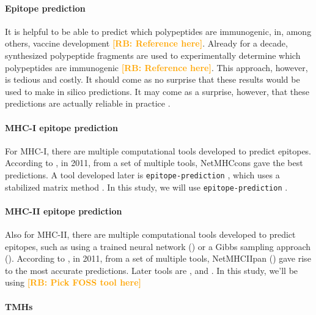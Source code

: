 \documentclass{article}
\newcommand{\richel}[1]{\textcolor{orange}{\textbf{[RB: #1]}}}
\begin{document}
\paragraph{Epitope prediction}

It is helpful to be able to predict which polypeptides are immunogenic,
in, among others, vaccine development \richel{Reference here}. 
Already for a decade, synthesized polypeptide fragments are used 
to experimentally determine which polypeptides
are immunogenic \richel{Reference here}.
This approach, however, is tedious and costly.
It should come as no surprise that these results would be used
to make in silico predictions.
It may come as a surprise, however, that these predictions
are actually reliable in practice \cite{larsen2010identification,schellens2008unanticipated,tang2011genome}.

\paragraph{MHC-I epitope prediction}

For MHC-I, there are multiple computational tools developed 
to predict epitopes. 
According to \cite{lundegaard2011prediction}, in 2011,
from a set of multiple tools, 
NetMHCcons \cite{karosiene2012netmhccons} gave the best predictions.
A tool developed later is \verb;epitope-prediction; \cite{bianchi2017},
which uses a stabilized matrix method \cite{kim2009derivation}.
In this study, we will use \verb;epitope-prediction; \cite{bianchi2017}.

\paragraph{MHC-II epitope prediction}

Also for MHC-II, there are multiple computational tools developed 
to predict epitopes,
such as using a trained neural network (\cite{nielsen2003reliable})
or a Gibbs sampling approach (\cite{nielsen2004improved}).
According to \cite{lundegaard2011prediction}, in 2011,
from a set of multiple tools, 
NetMHCIIpan (\cite{nielsen2008quantitative,karosiene2013netmhciipan})
gave rise to the most accurate predictions.
Later tools are \cite{zhang2013predicting},
\cite{trolle2014nettepi} and \cite{zhang2015accurate}.
In this study, we'll be using \richel{Pick FOSS tool here}

\paragraph{TMHs}
\end{document}
